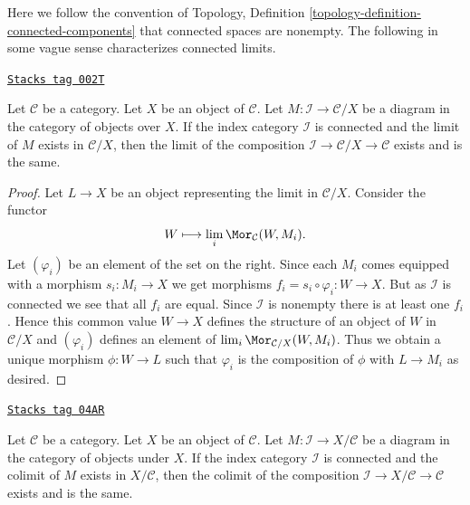 Here we follow the convention of
Topology, Definition \ref{topology-definition-connected-components}
that connected spaces are nonempty.
The following in some vague sense characterizes connected limits.

\begin{lemma}
\label{categories-lemma-connected-limit-over-X}
\href{https://stacks.math.columbia.edu/tag/002T}{\texttt{Stacks tag 002T}}

Let $\mathcal{C}$ be a category.
Let $X$ be an object of $\mathcal{C}$.
Let $M : \mathcal{I} \to \mathcal{C}/X$ be a diagram
in the category of objects over $X$.
If the index category $\mathcal{I}$ is connected
and the limit of $M$ exists in $\mathcal{C}/X$,
then the limit of the composition
$\mathcal{I} \to \mathcal{C}/X \to \mathcal{C}$
exists and is the same.
\end{lemma}

\begin{proof}
Let $L \to X$ be an object representing the limit in $\mathcal{C}/X$.
Consider the functor
$$
W \longmapsto \lim_i \Mor_\mathcal{C}(W, M_i).
$$
Let $(\varphi_i)$ be an element of the set on the right.
Since each $M_i$ comes equipped with a morphism $s_i : M_i \to X$ we
get morphisms $f_i = s_i \circ \varphi_i : W \to X$. But as $\mathcal{I}$
is connected we see that all $f_i$ are equal. Since $\mathcal{I}$
is nonempty there is at least one $f_i$.
Hence this common value $W \to X$ defines the structure of an
object of $W$ in $\mathcal{C}/X$ and $(\varphi_i)$ defines an
element of $\lim_i \Mor_{\mathcal{C}/X}(W, M_i)$.
Thus we obtain a unique morphism $\phi : W \to L$ such that
$\varphi_i$ is the composition of $\phi$ with $L \to M_i$ as desired.
\end{proof}

\begin{lemma}
\label{categories-lemma-connected-colimit-under-X}
\href{https://stacks.math.columbia.edu/tag/04AR}{\texttt{Stacks tag 04AR}}

Let $\mathcal{C}$ be a category.
Let $X$ be an object of $\mathcal{C}$.
Let $M : \mathcal{I} \to X/\mathcal{C}$ be a diagram
in the category of objects under $X$.
If the index category $\mathcal{I}$ is connected
and the colimit of $M$ exists in $X/\mathcal{C}$,
then the colimit of the composition
$\mathcal{I} \to X/\mathcal{C} \to \mathcal{C}$
exists and is the same.
\end{lemma}

